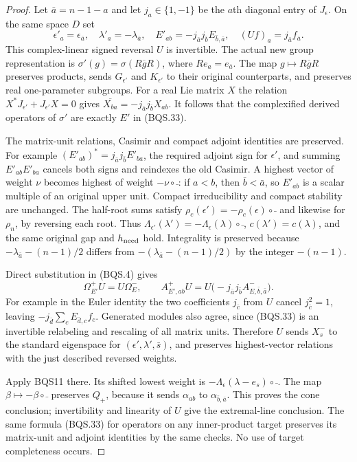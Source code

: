 \begin{proof}
Let $\bar a=n-1-a$ and let $j_a\in\{1,-1\}$ be the $a$th diagonal
entry of $J_\epsilon$.  On the same space $D$ set
\[
 \epsilon'_a=\epsilon_{\bar a},\quad
 \lambda'_a=-\lambda_{\bar a},\quad
 E'_{ab}=-j_{\bar a}j_{\bar b}E_{\bar b,\bar a},\quad
 (Uf)_a=j_{\bar a}f_{\bar a}.
 \tag{BQS.33}
\]
This complex-linear signed reversal $U$ is invertible.
The actual new group representation is
$\sigma'(g)=\sigma(R\overline gR)$, where $R e_a=e_{\bar a}$.
The map $g\mapsto R\overline gR$ preserves products, sends
$G_{\epsilon'}$ and $K_{\epsilon'}$ to their original counterparts,
and preserves real one-parameter subgroups.
For a real Lie matrix $X$ the relation
$X^*J_{\epsilon'}+J_{\epsilon'}X=0$ gives
$\overline{X_{ba}}=-j_{\bar a}j_{\bar b}X_{ab}$.
It follows that the complexified derived operators of $\sigma'$ are
exactly $E'$ in (BQS.33).

The matrix-unit relations, Casimir and compact adjoint identities are
preserved.  For example
$(E'_{ab})^*=j_{\bar a}j_{\bar b}E'_{ba}$, the required adjoint sign
for $\epsilon'$, and summing $E'_{ab}E'_{ba}$ cancels both signs and
reindexes the old Casimir.
A highest vector of weight $\nu$ becomes highest of weight
$-\nu\circ\bar{\ }$: if $a<b$, then $\bar b<\bar a$, so
$E'_{ab}$ is a scalar multiple of an original upper unit.
Compact irreducibility and compact stability are unchanged.
The half-root sums satisfy
$\rho_c(\epsilon')=-\rho_c(\epsilon)\circ\bar{\ }$ and likewise for
$\rho_n$, by reversing each root.
Thus
$\Lambda_{\epsilon'}(\lambda')=-\Lambda_\epsilon(\lambda)\circ\bar{\ }$,
$c(\lambda')=c(\lambda)$, and the same original gap and $h_{\rm need}$
hold.  Integrality is preserved because
$-\lambda_{\bar a}-(n-1)/2$ differs from
$-(\lambda_{\bar a}-(n-1)/2)$ by the integer $-(n-1)$.

Direct substitution in (BQS.4) gives
\[
 \Omega^+_{E'}U=U\Omega^-_E,\qquad
 A^+_{E',ab}U
     =U\bigl(-j_{\bar a}j_{\bar b}A^-_{E,\bar b,\bar a}\bigr).
 \tag{BQS.34}
\]
For example in the Euler identity the two coefficients
$j_{\bar c}$ from $U$ cancel $j_{\bar c}^2=1$, leaving
$-j_{\bar d}\sum_cE_{\bar d,c}f_c$.
Generated modules also agree, since (BQS.33) is an invertible
relabeling and rescaling of all matrix units.
Therefore $U$ sends $X_s^-$ to the standard eigenspace for
$(\epsilon',\lambda',\bar s)$, and preserves highest-vector relations
with the just described reversed weights.

Apply BQS11 there.  Its shifted lowest weight is
$-\Lambda_\epsilon(\lambda-e_s)\circ\bar{\ }$.
The map $\beta\mapsto-\beta\circ\bar{\ }$ preserves $Q_+$, because
it sends $\alpha_{ab}$ to $\alpha_{\bar b,\bar a}$.
This proves the cone conclusion; invertibility and linearity of $U$
give the extremal-line conclusion.
The same formula (BQS.33) for operators on any inner-product target
preserves its matrix-unit and adjoint identities by the same checks.
No use of target completeness occurs.
\end{proof}

